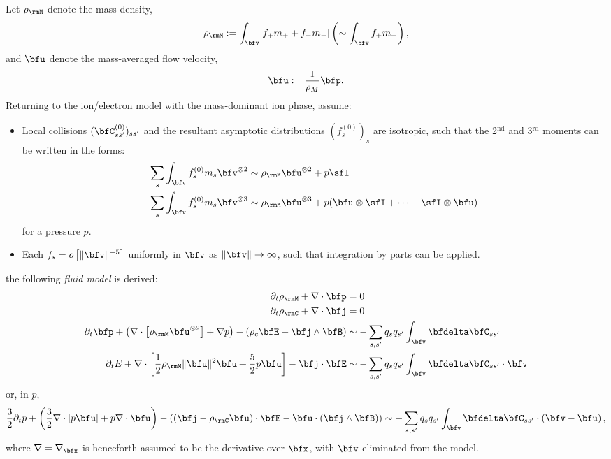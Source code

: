     Let $\rho_{\rmM}$ denote the mass density,
    \begin{equation}
        \rho_{\rmM}  :=  \int_{\bfv}[f_{+}m_{+} + f_{-}m_{-}]  \left(\sim  \int_{\bfv}f_{+}m_{+}\right),
    \end{equation}
    and $\bfu$ denote the mass-averaged flow velocity,
    \begin{equation}
        \bfu  :=  \frac{1}{\rho_{M}}\bfp.
    \end{equation}
    Returning to the ion/electron model with the mass-dominant ion phase, assume:
    \begin{itemize}
        \item  Local collisions $(\bfC_{ss'}^{(0)})_{ss'}$ and the resultant asymptotic distributions $(f_{s}^{(0)})_{s}$ are isotropic, such that the 2$^{\text{nd}}$ and 3$^{\text{rd}}$ moments can be written in the forms:
        \begin{align}
            \sum_{s}\int_{\bfv}f_{s}^{(0)}m_{s}\bfv^{\otimes 2}  &\sim  \rho_{\rmM}\bfu^{\otimes 2} + p\sfI  \\
            \sum_{s}\int_{\bfv}f_{s}^{(0)}m_{s}\bfv^{\otimes 3}  &\sim  \rho_{\rmM}\bfu^{\otimes 3} + p(\bfu\otimes\sfI + \cdots + \sfI\otimes\bfu)
        \end{align}
        for a pressure $p$. 
        \item  Each $f_{s}  =  o\left[\|\bfv\|^{- 5}\right]$ uniformly in $\bfv$ as $\|\bfv\|  \rightarrow  \infty$, such that integration by parts can be applied.
    \end{itemize}
    the following \emph{fluid model} is derived:
    \begin{align}
        \partial_{t}\rho_{\rmM} + \nabla\cdot\bfp  &=  0  \\
        \partial_{t}\rho_{\rmC} + \nabla\cdot\bfj  &=  0  \\
        \partial_{t}\bfp + \left(\nabla\cdot\left[\rho_{\rmM}\bfu^{\otimes 2}\right] + \nabla p\right) - \left(\rho_{c}\bfE + \bfj\wedge\bfB\right)  &\sim  - \sum_{s, s'}q_{s}q_{s'}\int_{\bfv}\bfdelta\bfC_{ss'}  \\
        \partial_{t}E + \nabla\cdot\left[\frac{1}{2}\rho_{\rmM}\|\bfu\|^{2}\bfu + \frac{5}{2}p\bfu\right] - \bfj\cdot\bfE  &\sim  - \sum_{s, s'}q_{s}q_{s'}\int_{\bfv}\bfdelta\bfC_{ss'}\cdot\bfv
    \end{align}
    or, in $p$,
    \begin{equation}
        \frac{3}{2}\partial_{t}p + \left(\frac{3}{2}\nabla\cdot[p\bfu] + p\nabla\cdot\bfu\right) - ((\bfj - \rho_{\rmC}\bfu)\cdot\bfE - \bfu\cdot(\bfj\wedge\bfB))  \sim  - \sum_{s, s'}q_{s}q_{s'}\int_{\bfv}\bfdelta\bfC_{ss'}\cdot\left(\bfv - \bfu\right),
    \end{equation}
    where $\nabla  =  \nabla_{\bfx}$ is henceforth assumed to be the derivative over $\bfx$, with $\bfv$ eliminated from the model.
    